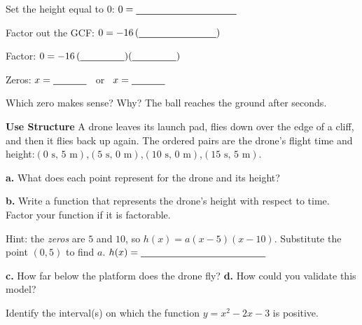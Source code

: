 \begin{minipage}[t]{0.55\textwidth}
\vspace{0pt}\raggedright
Set the height equal to $0$: \quad $0=\blank[3.6cm]$\par\vspace{8pt}
Factor out the GCF: \quad $0=-16\,(\blank[2.8cm])$\par\vspace{8pt}
Factor: \quad $0=-16\,(\blank[1.6cm])(\blank[1.6cm])$\par\vspace{8pt}
Zeros: \quad $x=\blank[1.2cm]$ \ or \ $x=\blank[1.2cm]$
\end{minipage}\hfill
\begin{minipage}[t]{0.41\textwidth}
\vspace{0pt}\raggedright
Which zero makes sense? Why?
\lines[3]
The ball reaches the ground after \blank[1.4cm] seconds.
\end{minipage}

\textbf{Use Structure} A drone leaves its launch pad, flies down over the edge of a cliff, and then it flies back up again. The ordered pairs are the drone's flight time and height:\quad $(0\text{ s},\,5\text{ m})$,\quad $(5\text{ s},\,0\text{ m})$,\quad $(10\text{ s},\,0\text{ m})$,\quad $(15\text{ s},\,5\text{ m})$.

\textbf{a.} What does each point represent for the drone and its height?
\lines[2]

\textbf{b.} Write a function that represents the drone's height with respect to time. Factor your function if it is factorable.

Hint: the \emph{zeros} are $5$ and $10$, so $h(x)=a(x-5)(x-10)$. Substitute the point $(0,5)$ to find $a$.
\twolines[2]
$h(x)=\blank[4.5cm]$

\textbf{c.} How far below the platform does the drone fly? \qquad \textbf{d.} How could you validate this model?
\twolines[3]

\newpage
{}
Identify the interval(s) on which the function $y=x^2-2x-3$ is positive.

